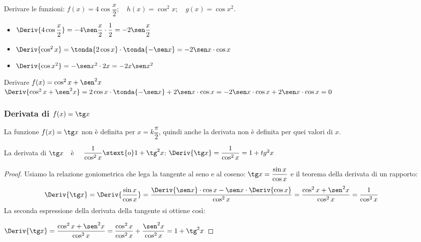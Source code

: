 \begin{esempio}
Derivare le funzioni: 
\(f(x)=4 \cos \dfrac{x}{2}; \quad h(x) = \cos^2 x; \quad g(x)= \cos x^2\).
\begin{itemize}
\item \(\Deriv{4 \cos \dfrac{x}{2}} = 
                  -4 \sen \dfrac{x}{2} \cdot \dfrac{1}{2} = 
                  -2 \sen \dfrac{x}{2}\)
\item \(\Deriv{\cos^2 x} = \tonda{2 \cos x} \cdot \tonda{-\sen x} = 
                           -2 \sen x \cdot \cos x\)
\item \(\Deriv{\cos x^2} = -\sen x^2 \cdot 2x = -2x \sen x^2\)
\end{itemize}
\end{esempio}

\begin{esempio}
Derivare \(f(x)=\cos^2 x +\sen^2 x\)\\
\(\Deriv{\cos^2 x +\sen^2 x} = 
    2 \cos x \cdot \tonda{-\sen x} + 2 \sen x \cdot \cos x = 
    - 2 \sen x \cdot \cos x + 2 \sen x \cdot \cos x = 0\)
\end{esempio}


\subsubsection{Derivata di \(f(x)=\tg x\)}
La funzione \(f(x)=\tg x\) non è definita per \(x = k \dfrac{\pi}{2}\), 
quindi anche la derivata non è definita per quei valori di \(x\).

\begin{teorema}
La derivata di \(\tg x\)~~è~~ 
\(\dfrac{1}{\cos^2 x} \stext{ o } 1+\tg^2 x\): %
\qquad \(\Deriv{\tg x} = \dfrac{1}{\cos^2 x} = 1+tg^2 x\)
\end{teorema}
\begin{proof}
Usiamo la relazione goniometrica che lega la tangente al seno e al coseno:
\(\tg x=\dfrac{\sin x}{\cos x}\) e 
il teorema della derivata di un rapporto:
\begin{align*}
\Deriv{\tg x} &= \Deriv{\dfrac{\sin x}{\cos x}} =
\dfrac{\Deriv{\sen x}\cdot \cos x-\sen x\cdot \Deriv{\cos x}} {\cos^2 x}=
\dfrac{\cos^2 x +\sen^2 x}{\cos^2 x} = \dfrac{1}{\cos^2 x}
\end{align*}
La seconda espressione della derivata della tangente si ottiene così:

\hspace{10mm}
\(\Deriv{\tg x} = 
\dfrac{\cos^2 x +\sen^2 x}{\cos^2 x} = 
\dfrac{\cos^2 x}{\cos^2 x} + \dfrac{\sen^2 x}{\cos^2 x} = 1 +\tg^2 x\)
\end{proof}


